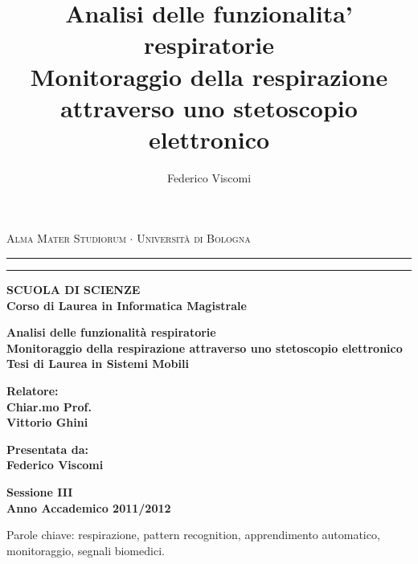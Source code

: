 \documentclass[12pt,a4paper]{report}
\title{Analisi delle funzionalita' respiratorie \\ \large Monitoraggio della respirazione attraverso uno stetoscopio elettronico \\[4mm]}
\author{Federico Viscomi}
\begin{document}
\begin{titlepage}
  \begin{center}
    {{\Large{\textsc{Alma Mater Studiorum $\cdot$ Universit\`a di Bologna}}}} 
    \rule[0.1cm]{15.0cm}{0.1mm}
    \rule[0.5cm]{15.0cm}{0.6mm}
    {\small{\bf SCUOLA DI SCIENZE\\
    Corso di Laurea in Informatica Magistrale}}
  \end{center}
  \vspace{15mm}
  \begin{center}
    {\LARGE{\bf Analisi delle funzionalit\`a respiratorie}}\\
    \vspace{3mm}
    {\large{\bf Monitoraggio della respirazione attraverso uno stetoscopio elettronico}}\\
    \vspace{19mm} {\large{\bf Tesi di Laurea in Sistemi Mobili}}
  \end{center}
  \vspace{40mm}
  \par
  \noindent
  \begin{minipage}[t]{0.47\textwidth}
    {\large{\bf Relatore:\\
    Chiar.mo Prof.\\
    Vittorio Ghini}}
  \end{minipage}
\hfill
  \begin{minipage}[t]{0.47\textwidth}\raggedleft
    {\large{\bf Presentata da:\\
    Federico Viscomi\\}}
  \end{minipage}
  \vspace{20mm}
  \begin{center}
    {\large{\bf Sessione III\\
    Anno Accademico 2011/2012}}
  \end{center}
\end{titlepage}

Parole chiave: respirazione, pattern recognition, apprendimento automatico, monitoraggio, segnali biomedici.
\end{document}
